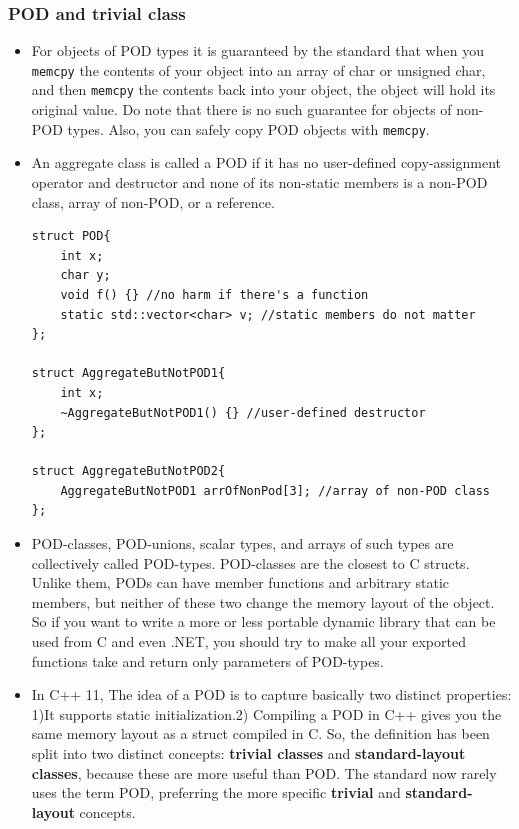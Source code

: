 \documentclass[a4paper,11pt,twoside]{book}
\begin{document}
\subsubsection{POD and trivial class}
\begin{itemize}
	
	\item For objects of POD types it is guaranteed by the standard that when you \texttt{memcpy} the contents of your object into an array of char or unsigned char, and then \texttt{memcpy} the contents back into your object, the object will hold its original value. Do note that there is no such guarantee for objects of non-POD types. Also, you can safely copy POD objects with \texttt{memcpy}.
	
	\item An aggregate class is called a POD if it has no user-defined copy-assignment operator and destructor and none of its non-static members is a non-POD class, array of non-POD, or a reference.
	
\begin{lstlisting}[numbers=none]
struct POD{
	int x;
	char y;
	void f() {} //no harm if there's a function
	static std::vector<char> v; //static members do not matter
};
	
struct AggregateButNotPOD1{
	int x;
	~AggregateButNotPOD1() {} //user-defined destructor
};
	
struct AggregateButNotPOD2{
	AggregateButNotPOD1 arrOfNonPod[3]; //array of non-POD class
};
\end{lstlisting}
	
	
	\item POD-classes, POD-unions, scalar types, and arrays of such types are collectively called POD-types. POD-classes are the closest to C structs. Unlike them, PODs can have member functions and arbitrary static members, but neither of these two change the memory layout of the object. So if you want to write a more or less portable dynamic library that can be used from C and even .NET, you should try to make all your exported functions take and return only parameters of POD-types.
		
	
	\item In C++ 11, The idea of a POD is to capture basically two distinct properties: 1)It supports static initialization.2) Compiling a POD in C++ gives you the same memory layout as a struct compiled in C. So, the definition has been split into two distinct concepts: \textbf{trivial classes} and \textbf{standard-layout classes}, because these are more useful than POD. The standard now rarely uses the term POD, preferring the more specific \textbf{trivial} and \textbf{standard-layout} concepts.




\end{itemize}
\end{document}
